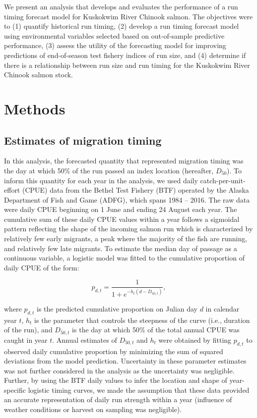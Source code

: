\documentclass[12pt,]{book}
\theoremstyle{definition}
\theoremstyle{definition}
\theoremstyle{definition}
\theoremstyle{remark}
\begin{document}
We present an analysis that develops and evaluates the performance of a
run timing forecast model for Kuskokwim River Chinook salmon. The
objectives were to (1) quantify historical run timing, (2) develop a run
timing forecast model using environmental variables selected based on
out-of-sample predictive performance, (3) assess the utility of the
forecasting model for improving predictions of end-of-season test
fishery indices of run size, and (4) determine if there is a
relationship between run size and run timing for the Kuskokwim River
Chinook salmon stock.

\section{Methods}\label{methods}

\subsection{Estimates of migration
timing}\label{estimates-of-migration-timing}

In this analysis, the forecasted quantity that represented migration
timing was the day at which 50\% of the run passed an index location
(hereafter, \(D_{50}\)). To inform this quantity for each year in the
analysis, we used daily catch-per-unit-effort (CPUE) data from the
Bethel Test Fishery (BTF) operated by the Alaska Department of Fish and
Game (ADFG), which spans 1984 -- 2016. The raw data were daily CPUE
beginning on 1 June and ending 24 August each year. The cumulative sum
of these daily CPUE values within a year follows a sigmoidal pattern
reflecting the shape of the incoming salmon run which is characterized
by relatively few early migrants, a peak where the majority of the fish
are running, and relatively few late migrants. To estimate the median
day of passage as a continuous variable, a logistic model was fitted to
the cumulative proportion of daily CPUE of the form:

\begin{equation}
  p_{d,t}=\frac{1}{1 + e^{-h_t (d - D_{50,t})}},
  \label{eq:logistic}
\end{equation}

where \(p_{d,t}\) is the predicted cumulative proportion on Julian day
\(d\) in calendar year \(t\), \(h_t\) is the parameter that controls the
steepness of the curve (i.e., duration of the run), and \(D_{50,t}\) is
the day at which 50\% of the total annual CPUE was caught in year \(t\).
Annual estimates of \(D_{50,t}\) and \(h_t\) were obtained by fitting
\(p_{d,t}\) to observed daily cumulative proportion by minimizing the
sum of squared deviations from the model prediction. Uncertainty in
these parameter estimates was not further considered in the analysis as
the uncertainty was negligible. Further, by using the BTF daily values
to infer the location and shape of year-specific logistic timing curves,
we made the assumption that these data provided an accurate
representation of daily run strength within a year (influence of weather
conditions or harvest on sampling was negligible).
\end{document}

